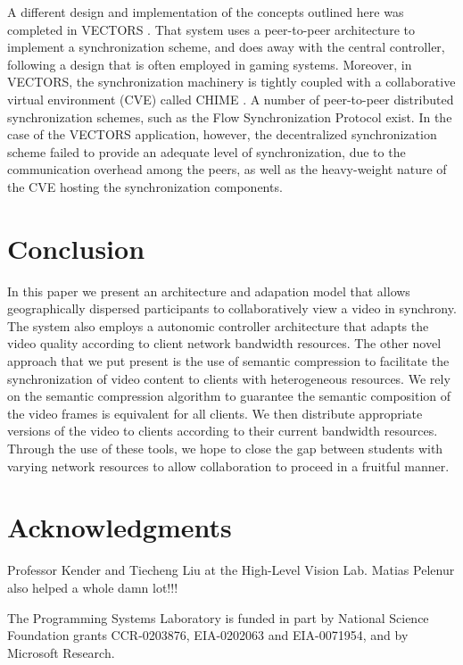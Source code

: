 \documentclass{sig-alternate}
\begin{document}
A different design and implementation of the concepts outlined here
was completed in VECTORS \cite{VECTORS}.  That system uses a
peer-to-peer architecture to implement a synchronization scheme, and
does away with the central controller, following a design that is
often employed in gaming systems.  Moreover, in VECTORS, the
synchronization machinery is tightly coupled with a collaborative
virtual environment (CVE) called CHIME \cite{CHIME}.  A number of
peer-to-peer distributed synchronization schemes, such as the Flow
Synchronization Protocol \cite{FSP} exist.  In the case of the VECTORS
application, however, the decentralized synchronization scheme failed
to provide an adequate level of synchronization, due to the
communication overhead among the peers, as well as the heavy-weight
nature of the CVE hosting the synchronization components.

\section{Conclusion}

In this paper we present an architecture and adapation model that
allows geographically dispersed participants to collaboratively view a
video in synchrony.  The system also employs a autonomic controller
architecture that adapts the video quality according to client network
bandwidth resources.  The other novel approach that we put present is
the use of semantic compression to facilitate the synchronization of
video content to clients with heterogeneous resources.  We rely on the
semantic compression algorithm to guarantee the semantic composition
of the video frames is equivalent for all clients.  We then distribute
appropriate versions of the video to clients according to their
current bandwidth resources.  Through the use of these tools, we hope
to close the gap between students with varying network resources to
allow collaboration to proceed in a fruitful manner.

\section{Acknowledgments}
Professor Kender and Tiecheng Liu at the High-Level Vision Lab.
Matias Pelenur also helped a whole damn lot!!!

The Programming Systems Laboratory is funded in part by National
Science Foundation grants CCR-0203876, EIA-0202063 and EIA-0071954,
and by Microsoft Research.
\end{document}
